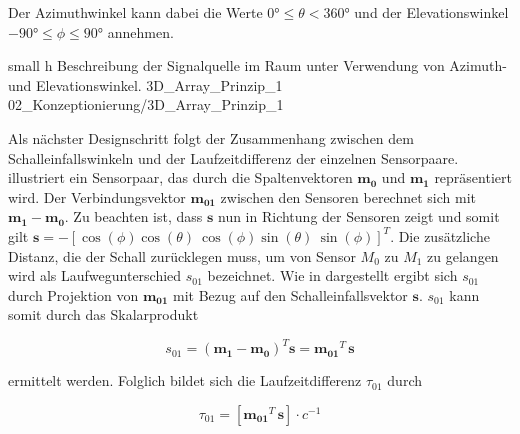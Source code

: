 Der Azimuthwinkel kann dabei die Werte $0° \leq \theta < 360°$ und der Elevationswinkel $-90° \leq \phi \leq 90°$ annehmen.


         {small} %
         {h} %
         {Beschreibung der Signalquelle im Raum unter Verwendung von Azimuth- und Elevationswinkel.} %
         {3D_Array_Prinzip_1} %
         {02_Konzeptionierung/3D_Array_Prinzip_1}


Als nächster Designschritt folgt der Zusammenhang zwischen dem Schalleinfallswinkeln und der Laufzeitdifferenz der einzelnen Sensorpaare.  illustriert ein Sensorpaar, das durch die Spaltenvektoren $\mathbf{m_0}$ und $\mathbf{m_1}$ repräsentiert wird. Der Verbindungsvektor $\mathbf{m_{01}}$ zwischen den Sensoren berechnet sich mit $\mathbf{m_1} - \mathbf{m_0}$.
Zu beachten ist, dass $\mathbf{s}$ nun in Richtung der Sensoren zeigt und somit gilt $\mathbf{s} = -\left[\cos(\phi) \cos(\theta) ~  \cos(\phi) \sin(\theta) ~ \sin(\phi) \right]^T$. Die zusätzliche Distanz, die der Schall zurücklegen muss, um von Sensor $M_0$ zu $M_1$ zu gelangen wird als Laufwegunterschied $s_{01}$ bezeichnet. Wie in  dargestellt ergibt sich $s_{01}$ durch Projektion von $\mathbf{m_{01}}$ mit Bezug auf den Schalleinfallsvektor $\mathbf{s}$.  $s_{01}$ kann somit durch das Skalarprodukt 

\begin{equation}
    s_{01} = \left ( \mathbf{m_1} - \mathbf{m_0} \right )^T \mathbf{s} = \mathbf{m_{01}}^T \, \mathbf{s}
\end{equation}

ermittelt werden. Folglich bildet sich die Laufzeitdifferenz $\tau_{01}$ durch

\begin{equation}
    \tau_{01} = \left[ \mathbf{m_{01}}^T \, \mathbf{s} \right] \cdot c^{-1}
\end{equation}
  



